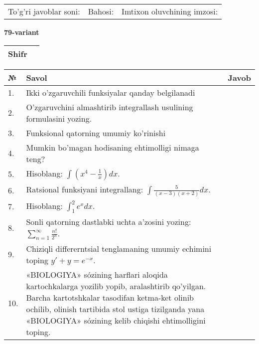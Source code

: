 \documentclass{article}
\begin{document}
  \vspace{1cm}
  
  \begin{tabular}{lll}
  To'g'ri javoblar soni: \underline{\hspace{1.5cm}} & 
  Bahosi: \underline{\hspace{1.5cm}} & 
  Imtixon oluvchining imzosi: \underline{\hspace{2cm}} \\
  \end{tabular}
  
  \egroup
  
  \newpage
  
  
  \textbf{79-variant}\\
  
  \bgroup
  \def\arraystretch{1.6} %
  
  \begin{tabular}{|m{5.7cm}|m{9.5cm}|}
  \hline
  Shifr & \\
  \hline
  \end{tabular}
  
  \vspace{1cm}
  
  \begin{tabular}{|m{0.7cm}|m{10cm}|m{4cm}|}
  \hline
  № & Savol & Javob \\
  \hline
  1. & Ikki o'zgaruvchili funksiyalar qanday belgilanadi &  \\
  \hline
  2. & O'zgaruvchini almashtirib integrallash usulining formulasini yozing. &  \\
  \hline
  3. & Funksional qatorning umumiy ko'rinishi &  \\
  \hline
  4. & Mumkin bo'magan hodisaning ehtimolligi nimaga teng? &  \\
  \hline
  5. & Hisoblang: \(\int \left( x^{4} - \frac{1}{x} \right)dx\). &  \\
  \hline
  6. & Ratsional funksiyani integrallang: \(\int {\frac{5}{(x - 3)(x + 2)}dx}\). &  \\
  \hline
  7. & Hisoblang: \(\int_{1}^{2}{e^{x}dx}\). &  \\
  \hline
  8. & Sonli qatorning dastlabki uchta a'zosini yozing: \(\sum_{n = 1}^{\infty}\frac{n!}{2^{n}}\). &  \\
  \hline
  9. & Chiziqli differerntsial tenglamaning umumiy echimini toping \(y' + y = e^{- x}\). &  \\
  \hline
  10. & «BIOLOGIYA» sózining harflari aloqida kartochkalarga yozilib yopib, aralashtirib qo'yilgan. Barcha kartotshkalar tasodifan ketma-ket olinib ochilib, olinish tartibida stol ustiga tizilganda yana «BIOLOGIYA» sózining kelib chiqishi ehtimolligini toping. &  \\
  \hline
  \end{tabular}
  
\end{document}
